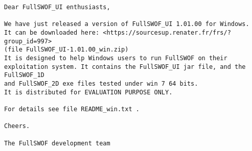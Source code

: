 \documentclass[a4paper, 11pt]{article}
\begin{document}
\begin{enumerate}
\begin{verbatim}
Dear FullSWOF_UI enthusiasts,

We have just released a version of FullSWOF_UI 1.01.00 for Windows.
It can be downloaded here: <https://sourcesup.renater.fr/frs/?group_id=997>
(file FullSWOF_UI-1.01.00_win.zip)
It is designed to help Windows users to run FullSWOF on their 
exploitation system. It contains the FullSWOF_UI jar file, and the FullSWOF_1D   
and FullSWOF_2D exe files tested under win 7 64 bits.
It is distributed for EVALUATION PURPOSE ONLY.

For details see file README_win.txt .

Cheers.

The FullSWOF development team 
\end{verbatim}
\end{enumerate}

\end{document}
